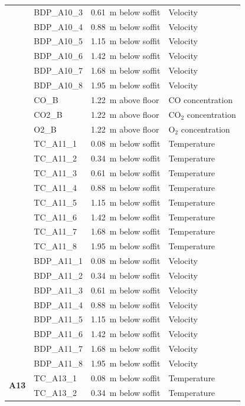 \documentclass[12pt,oneside]{book}
\begin{document}
\begin{longtable}[c]{c|lll}
 & BDP\_A10\_3 & 0.61~m below soffit  & Velocity \\
 & BDP\_A10\_4 & 0.88~m below soffit  & Velocity \\
 & BDP\_A10\_5 & 1.15~m below soffit  & Velocity \\
 & BDP\_A10\_6 & 1.42~m below soffit  & Velocity \\
 & BDP\_A10\_7 & 1.68~m below soffit  & Velocity \\
 & BDP\_A10\_8 & 1.95~m below soffit  & Velocity \\
\cline{2-4}
 & CO\_B      & 1.22~m above floor   & CO concentration \\
 & CO2\_B     & 1.22~m above floor   & CO$_2$ concentration \\
 & O2\_B      & 1.22~m above floor   & O$_2$ concentration \\
\bottomrule
\newpage
\multirow{16}{*}{\large{\textbf{A11}}}
 & TC\_A11\_1  & 0.08~m below soffit  & Temperature \\
 & TC\_A11\_2  & 0.34~m below soffit  & Temperature \\
 & TC\_A11\_3  & 0.61~m below soffit  & Temperature \\
 & TC\_A11\_4  & 0.88~m below soffit  & Temperature \\
 & TC\_A11\_5  & 1.15~m below soffit  & Temperature \\
 & TC\_A11\_6  & 1.42~m below soffit  & Temperature \\
 & TC\_A11\_7  & 1.68~m below soffit  & Temperature \\
 & TC\_A11\_8  & 1.95~m below soffit  & Temperature \\
\cline{2-4}
 & BDP\_A11\_1 & 0.08~m below soffit  & Velocity \\
 & BDP\_A11\_2 & 0.34~m below soffit  & Velocity \\
 & BDP\_A11\_3 & 0.61~m below soffit  & Velocity \\
 & BDP\_A11\_4 & 0.88~m below soffit  & Velocity \\
 & BDP\_A11\_5 & 1.15~m below soffit  & Velocity \\
 & BDP\_A11\_6 & 1.42~m below soffit  & Velocity \\
 & BDP\_A11\_7 & 1.68~m below soffit  & Velocity \\
 & BDP\_A11\_8 & 1.95~m below soffit  & Velocity \\
\midrule
\multirow{16}{*}{\large{\textbf{A13}}}
 & TC\_A13\_1  & 0.08~m below soffit  & Temperature \\
 & TC\_A13\_2  & 0.34~m below soffit  & Temperature \\

\end{longtable}
\end{document}
